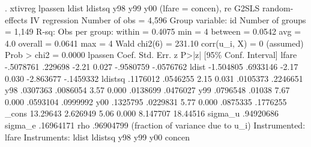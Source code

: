 . xtivreg lpassen ldist ldistsq y98 y99 y00 (lfare = concen), re
{\smallskip}
G2SLS random-effects IV regression              Number of obs     =      4,596
Group variable: id                              Number of groups  =      1,149
{\smallskip}
R-sq:                                           Obs per group:
     within  = 0.4075                                         min =          4
     between = 0.0542                                         avg =        4.0
     overall = 0.0641                                         max =          4
{\smallskip}
                                                Wald chi2(6)      =     231.10
corr(u_i, X)       = 0 (assumed)                Prob > chi2       =     0.0000
{\smallskip}
     lpassen {\VBAR}      Coef.   Std. Err.      z    P>|z|     [95\% Conf. Interval]
       lfare {\VBAR}  -.5078761    .229698    -2.21   0.027    -.9580759   -.0576762
       ldist {\VBAR}  -1.504805   .6933146    -2.17   0.030    -2.863677   -.1459332
     ldistsq {\VBAR}   .1176012   .0546255     2.15   0.031     .0105373    .2246651
         y98 {\VBAR}   .0307363   .0086054     3.57   0.000     .0138699    .0476027
         y99 {\VBAR}   .0796548     .01038     7.67   0.000     .0593104    .0999992
         y00 {\VBAR}   .1325795   .0229831     5.77   0.000     .0875335    .1776255
       _cons {\VBAR}   13.29643   2.626949     5.06   0.000     8.147707    18.44516
     sigma_u {\VBAR}  .94920686
     sigma_e {\VBAR}  .16964171
         rho {\VBAR}  .96904799   (fraction of variance due to u_i)
Instrumented:   lfare
Instruments:    ldist ldistsq y98 y99 y00 concen
{\smallskip}
